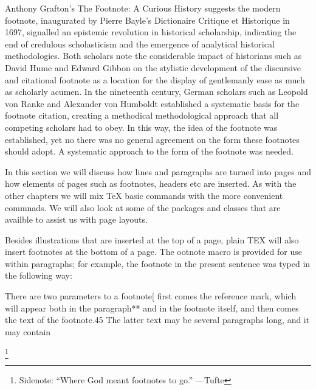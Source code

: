 {Anthony Grafton's The Footnote: A Curious History suggests the modern footnote, inaugurated by Pierre Bayle's Dictionaire Critique et Historique in 1697, signalled an epistemic revolution in historical scholarship, indicating the end of credulous scholasticism and the emergence of analytical historical methodologies. Both scholars note the considerable impact of historians such as David Hume and Edward Gibbon on the stylistic development of the discursive and citational footnote as a location for the display of gentlemanly ease as much as scholarly acumen. In the nineteenth century, German scholars such as Leopold von Ranke and Alexander von Humboldt established a systematic basis for the footnote citation, creating a methodical methodological approach that all competing scholars had to obey. In this way, the idea of the footnote was established, yet no there was no general agreement on the form these footnotes should adopt. A systematic approach to the form of the footnote was needed.}

In this section we will discuss how lines and paragraphs are turned into pages and how elements of pages such as footnotes, headers etc are inserted. As with the other chapters we will mix TeX basic commands with the more convenient \LaTeXe commnads. We will also look at some of the packages and classes that are availble to assist us with page layouts. 

\begin{minipage}{3in}
Besides illustrations that are inserted at the top of a page, plain TEX will also
insert footnotes at the bottom of a page. The ootnote macro is provided
for use within paragraphs;  for example, the footnote in the present sentence was typed
in the following way:


There are two parameters to a footnote[ first comes the reference mark, which will
appear both in the paragraph** and in the footnote itself, and then comes the text of
the footnote.45 The latter text may be several paragraphs long, and it may contain
\end{minipage}\footnote{Sidenote: ``Where God meant footnotes to go.'' ---Tufte}

